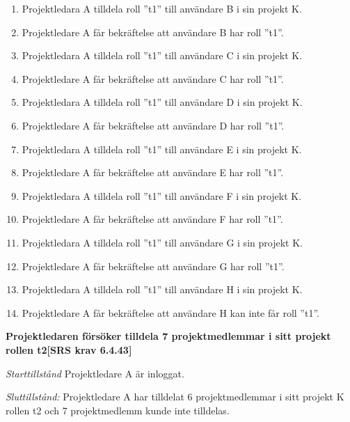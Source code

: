 \documentclass[a4paper]{article}
\begin{document}
\begin{FT}
\begin{enumerate}
\item Projektledara A tilldela roll ”t1” till användare B i sin projekt K. 
\item Projektledare A får bekräftelse att användare B har roll ”t1”.
\item Projektledara A tilldela roll ”t1” till användare C i sin projekt K. 
\item Projektledare A får bekräftelse att användare C har roll ”t1”.
\item Projektledara A tilldela roll ”t1” till användare D i sin projekt K. 
\item Projektledare A får bekräftelse att användare D har roll ”t1”.
\item Projektledara A tilldela roll ”t1” till användare E i sin projekt K. 
\item Projektledare A får bekräftelse att användare E har roll ”t1”.
\item Projektledara A tilldela roll ”t1” till användare F i sin projekt K.
\item Projektledare A får bekräftelse att användare F har roll ”t1”.
\item Projektledara A tilldela roll ”t1” till användare G i sin projekt K. 
\item Projektledare A får bekräftelse att användare G har roll ”t1”.
\item Projektledara A tilldela roll ”t1” till användare H i sin projekt K. 
\item Projektledare A får bekräftelse att användare H kan inte får roll ”t1”.
\end{enumerate}

\item %
\textbf{Projektledaren försöker tilldela 7 projektmedlemmar i sitt projekt rollen t2[SRS krav 6.4.43]}

\emph{Starttillstånd} Projektledare A är inloggat.

\emph{Sluttillstånd:} Projektledare A  har tilldelat 6 projektmedlemmar i sitt projekt K  rollen t2 och 7 projektmedlemm kunde inte tilldelas.


\end{FT}
\end{document}
